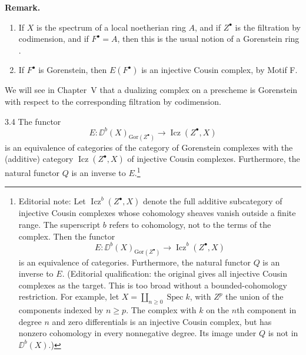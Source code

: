 \par\medskip\noindent\textbf{Remark.}
\begin{enumerate}
\item If $X$ is the spectrum of a local noetherian ring $A$, and if $Z^\bullet$ is the filtration by codimension, and if $F^\bullet=A$, then this is the usual notion of a Gorenstein ring \cite[ and Exercise~2 ff.]{LC}.
\item If $F^\bullet$ is Gorenstein, then $E(F^\bullet)$ is an injective Cousin complex, by Motif F.
\end{enumerate}
\par\medskip

\begin{example*}
We will see in Chapter~V that a dualizing complex on a prescheme is Gorenstein with respect to the corresponding filtration by codimension.
\end{example*}

\begin{bookproposition}{3.4}\label{prop:4.3.4}
The functor
\[
E\colon \DD^b(X)_{\mathrm{Gor}(Z^\bullet)}\longrightarrow \operatorname{Icz}(Z^\bullet,X)
\]
is an equivalence of categories of the category of Gorenstein complexes with the (additive) category $\operatorname{Icz}(Z^\bullet,X)$ of injective Cousin complexes. Furthermore, the natural functor $Q$ is an inverse to $E$.\footnote{Editorial note: Let $\operatorname{Icz}^{b}(Z^\bullet,X)$ denote the full additive subcategory of injective Cousin complexes whose cohomology sheaves vanish outside a finite range. The superscript $b$ refers to cohomology, not to the terms of the complex. Then the functor
\[
E\colon \DD^b(X)_{\mathrm{Gor}(Z^\bullet)}
 \longrightarrow \operatorname{Icz}^{b}(Z^\bullet,X)
\]
is an equivalence of categories. Furthermore, the natural functor $Q$ is an inverse to $E$. (Editorial qualification: the original gives all injective Cousin complexes as the target. This is too broad without a bounded-cohomology restriction. For example, let $X=\coprod_{n\geq0}\operatorname{Spec}k$, with $Z^p$ the union of the components indexed by $n\geq p$. The complex with $k$ on the $n$th component in degree $n$ and zero differentials is an injective Cousin complex, but has nonzero cohomology in every nonnegative degree. Its image under $Q$ is not in $\DD^b(X)$.)}
\end{bookproposition}

